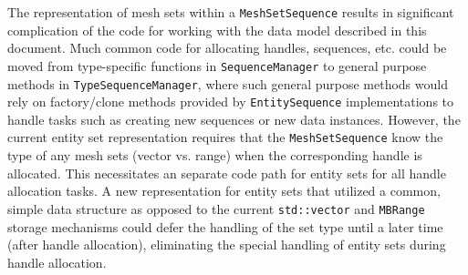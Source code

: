 \documentclass{report}
\begin{document}
The representation of mesh sets within a \texttt{MeshSetSequence} results in significant complication of the code for working with the data model described in this document.  Much common code for allocating handles, sequences, etc. could be moved from type-specific functions in \texttt{SequenceManager} to general purpose methods in \texttt{TypeSequenceManager}, where such general purpose methods would rely on factory/clone methods provided by \texttt{EntitySequence} implementations to handle tasks such as creating new sequences or new data instances.  However, the current entity set representation requires that the \texttt{MeshSetSequence} know the type of any mesh sets (vector vs. range) when the corresponding handle is allocated.  This necessitates an separate code path for entity sets for all handle allocation tasks.  A new representation for entity sets that utilized a common, simple data structure as opposed to the current \texttt{std::vector} and \texttt{MBRange} storage mechanisms could defer the handling of the set type until a later time (after handle allocation), eliminating the special handling of entity sets during handle allocation.
\end{document}
